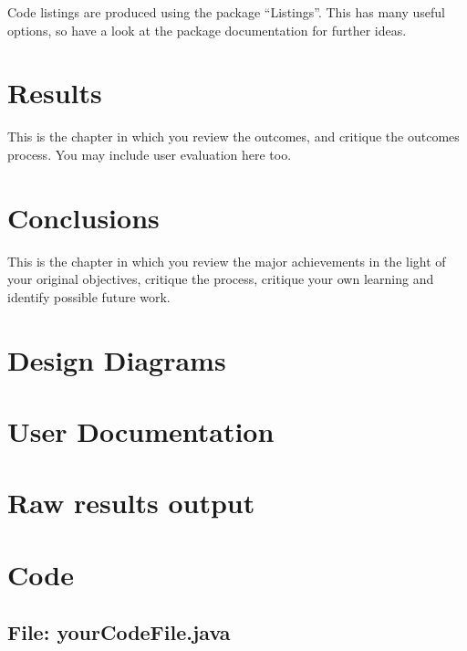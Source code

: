 \documentclass[11pt,openright,a4paper]{report}
\begin{document}
Code listings are produced using the package ``Listings''.  This has many
useful options, so have a look at the package documentation for further
ideas.


\chapter{Results}
This is the chapter in which you review the outcomes, and
critique the outcomes process.  You may include user evaluation here
too.



\chapter{Conclusions}
%

This is the chapter in which you review the major achievements in the
light of your original objectives, critique the process, critique your
own learning and identify possible future work.





\appendix


\chapter{Design Diagrams}

\chapter{User Documentation}

\chapter{Raw results output}

\chapter{Code}


\begin{landscape}
\begin{multicols}{2}
\section{File: yourCodeFile.java}

\end{multicols}
\end{landscape}
\end{document}
